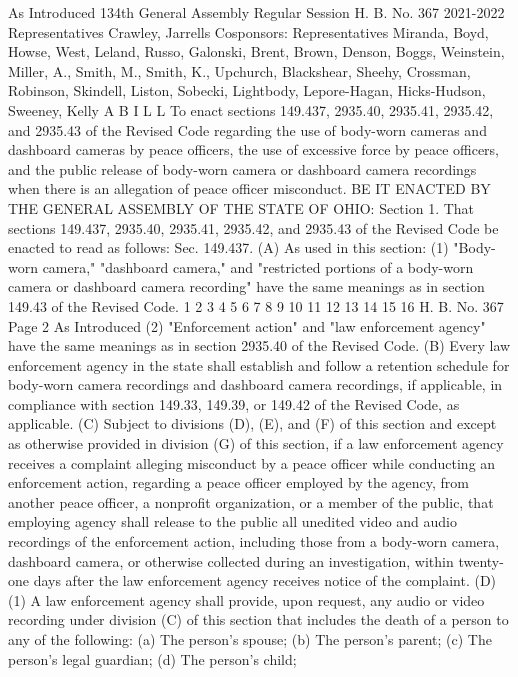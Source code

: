 As Introduced
134th General Assembly
Regular Session H. B. No. 367
2021-2022
Representatives Crawley, Jarrells
Cosponsors: Representatives Miranda, Boyd, Howse, West, Leland, Russo,
Galonski, Brent, Brown, Denson, Boggs, Weinstein, Miller, A., Smith, M., Smith,
K., Upchurch, Blackshear, Sheehy, Crossman, Robinson, Skindell, Liston,
Sobecki, Lightbody, Lepore-Hagan, Hicks-Hudson, Sweeney, Kelly
A B I L L
To enact sections 149.437, 2935.40, 2935.41,
2935.42, and 2935.43 of the Revised Code
regarding the use of body-worn cameras and
dashboard cameras by peace officers, the use of
excessive force by peace officers, and the
public release of body-worn camera or dashboard
camera recordings when there is an allegation of
peace officer misconduct.
BE IT ENACTED BY THE GENERAL ASSEMBLY OF THE STATE OF OHIO:
Section 1. That sections 149.437, 2935.40, 2935.41,
2935.42, and 2935.43 of the Revised Code be enacted to read as
follows:
 Sec. 149.437. (A) As used in this section:
(1) "Body-worn camera," "dashboard camera," and
"restricted portions of a body-worn camera or dashboard camera
recording" have the same meanings as in section 149.43 of the
Revised Code.
1
2
3
4
5
6
7
8
9
10
11
12
13
14
15
16
H. B. No. 367 Page 2
As Introduced
(2) "Enforcement action" and "law enforcement agency" have
the same meanings as in section 2935.40 of the Revised Code.
(B) Every law enforcement agency in the state shall
establish and follow a retention schedule for body-worn camera
recordings and dashboard camera recordings, if applicable, in
compliance with section 149.33, 149.39, or 149.42 of the Revised
Code, as applicable.
(C) Subject to divisions (D), (E), and (F) of this section
and except as otherwise provided in division (G) of this
section, if a law enforcement agency receives a complaint
alleging misconduct by a peace officer while conducting an
enforcement action, regarding a peace officer employed by the
agency, from another peace officer, a nonprofit organization, or
a member of the public, that employing agency shall release to
the public all unedited video and audio recordings of the
enforcement action, including those from a body-worn camera,
dashboard camera, or otherwise collected during an
investigation, within twenty-one days after the law enforcement
agency receives notice of the complaint.
(D)(1) A law enforcement agency shall provide, upon
request, any audio or video recording under division (C) of this
section that includes the death of a person to any of the
following:
(a) The person's spouse;
(b) The person's parent;
(c) The person's legal guardian;
(d) The person's child;
